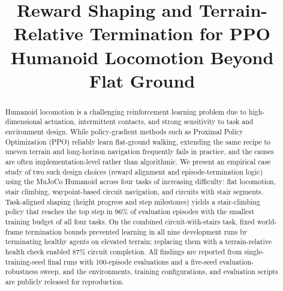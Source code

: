 \documentclass[conference,a4paper]{IEEEtran}
\begin{document}
\title{Reward Shaping and Terrain-Relative Termination for PPO Humanoid Locomotion Beyond Flat Ground}

\author{
\and
{}
\and
{}
\and
{}
}

\maketitle
{}

\begin{abstract}
Humanoid locomotion is a challenging reinforcement learning problem due to high-dimensional actuation, intermittent contacts, and strong sensitivity to task and environment design. While policy-gradient methods such as Proximal Policy Optimization (PPO) reliably learn flat-ground walking, extending the same recipe to uneven terrain and long-horizon navigation frequently fails in practice, and the causes are often implementation-level rather than algorithmic. We present an empirical case study of two such design choices (reward alignment and episode-termination logic) using the MuJoCo Humanoid across four tasks of increasing difficulty: flat locomotion, stair climbing, waypoint-based circuit navigation, and circuits with stair segments. Task-aligned shaping (height progress and step milestones) yields a stair-climbing policy that reaches the top step in 96\% of evaluation episodes with the smallest training budget of all four tasks. On the combined circuit-with-stairs task, fixed world-frame termination bounds prevented learning in all nine development runs by terminating healthy agents on elevated terrain; replacing them with a terrain-relative health check enabled 87\% circuit completion. All findings are reported from single-training-seed final runs with 100-episode evaluations and a five-seed evaluation-robustness sweep, and the environments, training configurations, and evaluation scripts are publicly released for reproduction.
\end{abstract}
\end{document}
